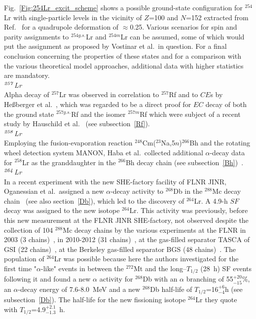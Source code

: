 Fig.~\ref{Fig:254Lr_excit_scheme} shows a possible ground-state configuration for $^{254}$Lr with single-particle levels in the vicinity of $Z$=100 and $N$=152 extracted from Ref.~\cite{Chasman1977} for a quadrupole deformation of $\approx$0.25. 
Various scenarios for spin and parity assignments to $^{254g.s.}$Lr and $^{254m}$Lr can be assumed, some of which would put the assignment as proposed by Vostinar et al.~in question. 
For a final conclusion concerning the properties of these states and for a comparison with the various theoretical model approaches, additional data with higher statistics are mandatory.\\

{\it $^{\it257}$Lr}\\ 
Alpha decay of $^{257}$Lr was observed in correlation to $^{257}$Rf and to $CE$s by He{\ss}berger et al.~\cite{Hessberger2016}, which was regarded to be a direct proof for $EC$ decay of both the ground state $^{257g.s.}$Rf and the isomer $^{257m}$Rf which were subject of a recent study by Hauschild et al.~\cite{Hauschild2022} (see subsection~\ref{Rf}).\\

{\it $^{\it258}$Lr}\\ 
Employing the fusion-evaporation reaction $^{248}$Cm($^{23}$Na,5$n$)$^{266}$Bh and the rotating wheel detection system MANON, Haba et al.~collected additional $\alpha$-decay data for $^{258}$Lr as the granddaughter in the $^{266}$Bh decay chain (see subsection~\ref{Bh})~\cite{Haba2020}.\\

{\it $^{\it264}$Lr}\\ 
In a recent experiment with the new SHE-factory facility of FLNR JINR, Oganessian et al.~assigned a new $\alpha$-decay activity to $^{268}$Db in the $^{288}$Mc decay chain~\cite{Oganessian2022c,Oganessian2022d} (see also section~\ref{Db}), which led to the discovery of $^{264}$Lr. 
A 4.9-h $SF$ decay was assigned to the new isotope $^{264}$Lr. 
This activity was previously, before this new measurement at the FLNR JINR SHE-factory, not observed despite the collection of 104 $^{288}$Mc decay chains by the various experiments at the FLNR in 2003 (3 chains)~\cite{Oganessian2004}, in 2010-2012 (31 chains)~\cite{Oganessian2013}, at the gas-filled separator TASCA of GSI (22 chains)~\cite{Rudolph2013}, at the Berkeley gas-filled separator BGS (48 chains)~\cite{Gates2015,Gates2018}. The population of $^{264}$Lr was possible because here the authors investigated for the first time "$\alpha$-like" events in between the $^{272}$Mt and the long--$T_{1/2}$ (28~h) SF events following it and found a new $\alpha$ activity for $^{268}$Db with an $\alpha$ branching of 55$^{+20}_{-15}$\%, an $\alpha$-decay energy of 7.6-8.0~MeV and a new $^{268}$Db half-life of $T_{1/2}$=16$^{+6}_{-4}$h (see subsection~\ref{Db}). 
The half-life for the new fissioning isotope $^{264}$Lr they quote with $T_{1/2}$=4.9$^{+2.1}_{-1.3}$~h.\\



